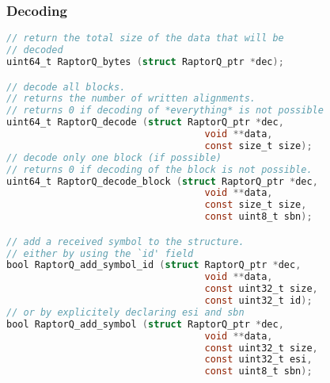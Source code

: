 \documentclass[11pt,a4paper]{refart}
\begin{document}
\subsubsection{Decoding}
\begin{lstlisting}[language=C]
// return the total size of the data that will be
// decoded
uint64_t RaptorQ_bytes (struct RaptorQ_ptr *dec);

// decode all blocks.
// returns the number of written alignments.
// returns 0 if decoding of *everything* is not possible
uint64_t RaptorQ_decode (struct RaptorQ_ptr *dec,
                                   void **data,
                                   const size_t size);
// decode only one block (if possible)
// returns 0 if decoding of the block is not possible.
uint64_t RaptorQ_decode_block (struct RaptorQ_ptr *dec,
                                   void **data,
                                   const size_t size,
                                   const uint8_t sbn);

// add a received symbol to the structure.
// either by using the `id' field
bool RaptorQ_add_symbol_id (struct RaptorQ_ptr *dec,
                                   void **data,
                                   const uint32_t size,
                                   const uint32_t id);
// or by explicitely declaring esi and sbn
bool RaptorQ_add_symbol (struct RaptorQ_ptr *dec,
                                   void **data,
                                   const uint32_t size,
                                   const uint32_t esi,
                                   const uint8_t sbn);
\end{lstlisting}





\printindex
\end{document}
